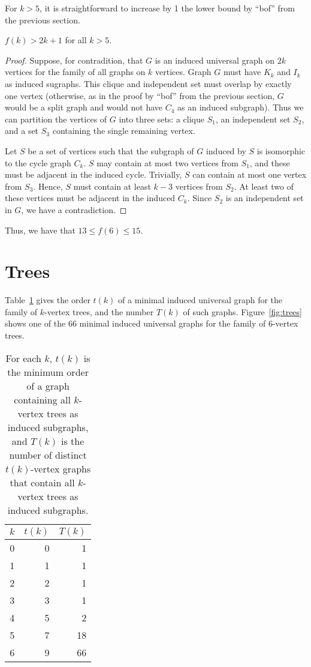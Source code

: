 \documentclass[12pt]{article}
\begin{document}
For $k > 5$, it is straightforward to increase by 1 the lower bound by ``bof'' from the previous
section.

\begin{proposition}
    $f(k) > 2k + 1$ for all $k > 5$.
\end{proposition}
\begin{proof}
    Suppose, for contradition, that $G$ is an induced universal graph on $2k$
    vertices for the family of all graphs on $k$ vertices.  Graph $G$ must have
    $K_k$ and $I_k$ as induced sugraphs.  This clique and independent set must
    overlap by exactly one vertex (otherwise, as in the proof by ``bof'' from
    the previous section, $G$ would be a split graph and would not have $C_4$
    as an induced subgraph).   Thus we can partition the vertices of $G$ into
    three sets: a clique $S_1$, an independent set $S_2$, and a set $S_3$
    containing the single remaining vertex.

    Let $S$ be a set of vertices such that the subgraph of $G$ induced by $S$
    is isomorphic to the cycle graph $C_k$.  $S$ may contain at most two vertices
    from $S_1$, and these must be adjacent in the induced cycle.  Trivially,
    $S$ can contain at most one vertex from $S_3$.  Hence, $S$ must contain at
    least $k-3$ vertices from $S_2$.  At least two of these vertices must be adjacent
    in the induced $C_k$.  Since $S_2$ is an independent set in $G$, we have a contradiction.
\end{proof}

Thus, we have that $13 \leq f(6) \leq 15$.

\section{Trees}

Table~\ref{tab:treeresults} gives the order $t(k)$ of a minimal induced universal graph for
the family of $k$-vertex trees, and the number $T(k)$ of such graphs.  Figure~\ref{fig:trees}
shows one of the 66 minimal induced universal graphs for the family of 6-vertex trees.

\begin{table}[h!]
\centering
\begin{tabular}{r r r}
 \toprule
 $k$ & $t(k)$ & $T(k)$ \\ [0.5ex]
 \midrule
 0 & 0 & 1 \\
 1 & 1 & 1 \\
 2 & 2 & 1 \\
 3 & 3 & 1 \\
 4 & 5 & 2 \\
 5 & 7 & 18 \\
 6 & 9 & 66 \\
 \bottomrule
\end{tabular}
\caption{For each $k$, $t(k)$ is the minimum order of a graph containing all $k$-vertex trees as
induced subgraphs, and $T(k)$ is the number of distinct $t(k)$-vertex graphs that contain
all $k$-vertex trees as induced subgraphs.}
\label{tab:treeresults}
\end{table}
\end{document}
